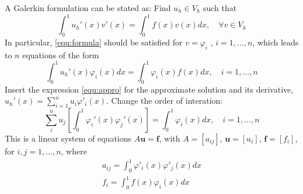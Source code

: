\documentclass[11pt]{article}
\begin{document}
A Galerkin formulation can be stated as: Find $u_h \in V_h$ such that
\begin{equation}\label{equ:formula}
	\int_0^1u_h'(x)v'(x) = \int_0^1f(x)v(x) dx, \quad \forall v \in V_h 
\end{equation}
In particular, \eqref{equ:formula} should be satisfied for $v = \varphi_i$ , $i = 1,...,n$, which leads to $n$ equations of the form
\begin{equation}
	\int_0^1 u_h'(x)\varphi_i(x)dx = \int_0^1\varphi_i(x)f(x)dx, \quad i = 1,...,n
\end{equation}
Insert the expression \eqref{equ:appro} for the approximate solution and its derivative, $u_h'(x) = \sum_{i=1}^n u_i\varphi'_i(x)$.
Change the order of interation:
\begin{equation}
	\sum_i^n u_j\left[\int_0^1\varphi_i'(x) \varphi_j'(x)\right]= \int_0^1\varphi_i(x) dx, \quad i = 1,...,n
\end{equation}
This is a linear system of equations $A\mathbf{u} = \mathbf{f}$, with $A = [a_{ij}]$, $\mathbf{u} = [u_i]$, $\mathbf{f} = [f_i]$, for $i,j = 1,...,n$, where
\begin{align}
	a_{ij} = \int_0^1\varphi'_i(x)\varphi'_j(x)dx \\
	f_i  = \int_0^1f(x)\varphi_i(x) dx
\end{align}
\end{document}

